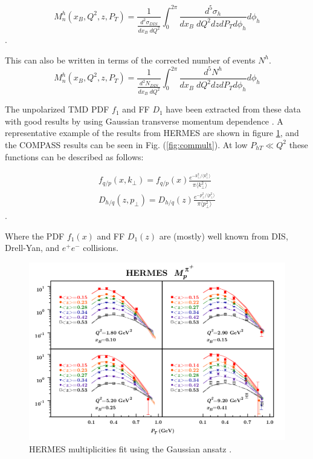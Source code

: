 \begin{equation} \label{eqn:sidis-multiplicities}
	M^{h}_{n} (x_B, Q^2, z, P_T) = \frac{1}{\frac{d^2\sigma_{DIS}}{dx_B \; dQ^2}} \int_{0}^{2\pi}  \frac{d^5\sigma_{h}}{dx_B \; dQ^2 dz dP_T d\phi_h} d\phi_h
\end{equation}.

This can also be written in terms of the corrected number of events $N^h$.  
\begin{equation} 
	M^{h}_{n} (x_B, Q^2, z, P_T) = \frac{1}{\frac{d^2N_{DIS}}{dx_B \; dQ^2}} \int_{0}^{2\pi}  \frac{d^5N^h}{dx_B \; dQ^2 dz dP_T d\phi_h} d\phi_h
\end{equation} 

The unpolarized TMD PDF $f_1$ and FF $D_1$ have been extracted from these data with good results by using Gaussian transverse momentum dependence \cite{tmds-anselmino:2013}.  A representative example of the results from HERMES are shown in figure \ref{fig:hermult}, and the COMPASS results can be seen in Fig. (\ref{fig:commult}).  At low $P_{hT} \ll Q^2$ these functions can be described as follows:

\begin{gather}\label{eqn:gaussian-ansatz}
	f_{q/p} (x, k_{\perp}) = f_{q/p} (x) \frac{e^{-k_{\perp}^2 / \langle k_{\perp}^2 \rangle}}{\pi \langle k_{\perp}^2 \rangle} \\ 
	D_{h/q} (z, p_{\perp}) = D_{h/q} (z) \frac{e^{-p_{\perp}^2 / \langle p_{\perp}^2 \rangle}}{\pi \langle p_{\perp}^2 \rangle} 
\end{gather}.

Where the PDF $f_1(x)$ and FF $D_1(z)$ are (mostly) well known from DIS, Drell-Yan, and $e^+e^-$ collisions. 

\begin{figure}
	\centering
	\includegraphics[width=\textwidth]{image/plots/introduction/hermes_multi_fit.png}
	\caption{HERMES multiplicities fit using the Gaussian ansatz \cite{tmds-anselmino:2013}.}
	\label{fig:hermult}
\end{figure}

